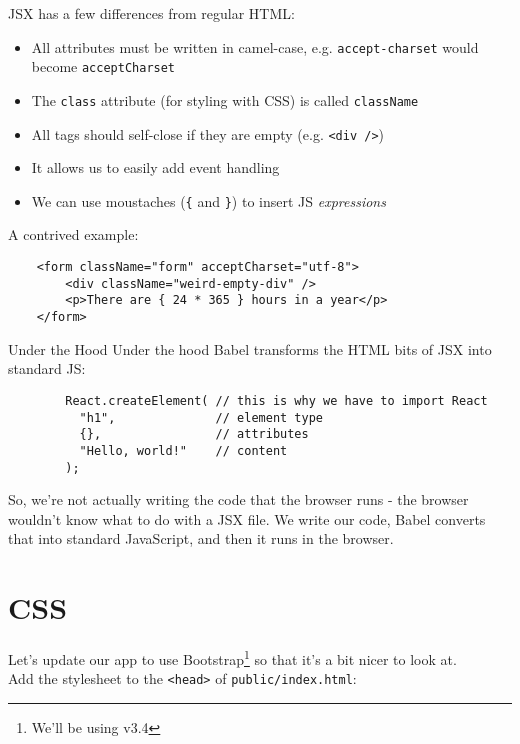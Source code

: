 JSX has a few differences from regular HTML:

\begin{itemize}
    \item All attributes must be written in camel-case, e.g. \texttt{accept-charset} would become \texttt{acceptCharset}
    \item The \texttt{class} attribute (for styling with CSS) is called \texttt{className}
    \item All tags should self-close if they are empty (e.g. \texttt{<div />})
    \item It allows us to easily add event handling
    \item We can use moustaches (\texttt{\{} and \texttt{\}}) to insert JS \textit{expressions}
\end{itemize}

A contrived example:

\begin{verbatim}
    <form className="form" acceptCharset="utf-8">
        <div className="weird-empty-div" />
        <p>There are { 24 * 365 } hours in a year</p>
    </form>
\end{verbatim}


\begin{infobox}{Under the Hood}
    Under the hood Babel transforms the HTML bits of JSX into standard JS:

    \begin{verbatim}
        React.createElement( // this is why we have to import React
          "h1",              // element type
          {},                // attributes
          "Hello, world!"    // content
        );
    \end{verbatim}

    So, we're not actually writing the code that the browser runs - the browser wouldn't know what to do with a JSX file. We write our code, Babel converts that into standard JavaScript, and then it runs in the browser.
\end{infobox}



\section{CSS}

Let's update our app to use Bootstrap\footnote{We'll be using v3.4} so that it's a bit nicer to look at.
\\

Add the stylesheet to the \texttt{<head>} of \texttt{public/index.html}:

